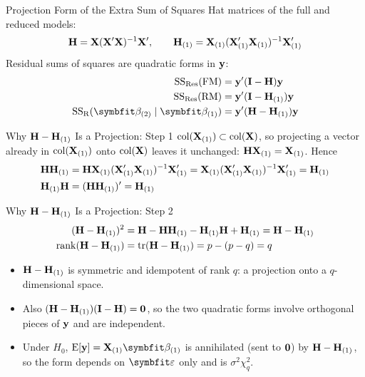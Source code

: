 \begin{frame}{Projection Form of the Extra Sum of Squares}
    Hat matrices of the full and reduced models:
    \[
    \mathbf{H}=\mathbf{X}(\mathbf{X}'\mathbf{X})^{-1}\mathbf{X}',
    \qquad
    \mathbf{H}_{(1)}=\mathbf{X}_{(1)}(\mathbf{X}_{(1)}'\mathbf{X}_{(1)})^{-1}\mathbf{X}_{(1)}'
    \]
    Residual sums of squares are quadratic forms in $\mathbf{y}$:
    \begin{align*}
        \SSRes(\FM) &= \by'(\bI-\bH)\by \\
        \SSRes(\RM) &= \by'(\bI-\bH_{(1)})\by \\
        \SSR(\bbeta_{(2)}\mid\bbeta_{(1)}) &= \by'(\bH-\bH_{(1)})\by
    \end{align*}
\end{frame}


\begin{frame}{Why $\mathbf{H}-\mathbf{H}_{(1)}$ Is a Projection: Step 1}
    $\operatorname{col}(\mathbf{X}_{(1)})\subset\operatorname{col}(\mathbf{X})$, so projecting a vector already in $\operatorname{col}(\mathbf{X}_{(1)})$ onto $\operatorname{col}(\mathbf{X})$ leaves it unchanged: $\mathbf{H}\mathbf{X}_{(1)}=\mathbf{X}_{(1)}$. Hence
    \begin{align*}
        \mathbf{H}\mathbf{H}_{(1)} &= \mathbf{H}\mathbf{X}_{(1)}(\mathbf{X}_{(1)}'\mathbf{X}_{(1)})^{-1}\mathbf{X}_{(1)}' = \mathbf{X}_{(1)}(\mathbf{X}_{(1)}'\mathbf{X}_{(1)})^{-1}\mathbf{X}_{(1)}' = \mathbf{H}_{(1)} \\
        \mathbf{H}_{(1)}\mathbf{H} &= (\mathbf{H}\mathbf{H}_{(1)})' = \mathbf{H}_{(1)}
    \end{align*}
\end{frame}


\begin{frame}{Why $\mathbf{H}-\mathbf{H}_{(1)}$ Is a Projection: Step 2}
    \begin{align*}
        (\mathbf{H}-\mathbf{H}_{(1)})^2 &= \mathbf{H} - \mathbf{H}\mathbf{H}_{(1)} - \mathbf{H}_{(1)}\mathbf{H} + \mathbf{H}_{(1)} = \mathbf{H}-\mathbf{H}_{(1)} \\
        \operatorname{rank}(\mathbf{H}-\mathbf{H}_{(1)}) &= \operatorname{tr}(\mathbf{H}-\mathbf{H}_{(1)}) = p-(p-q) = q
    \end{align*}
    \begin{itemize}
        \item $\mathbf{H}-\mathbf{H}_{(1)}$ is symmetric and idempotent of rank $q$: a projection onto a $q$-dimensional space.
        \item Also $(\mathbf{H}-\mathbf{H}_{(1)})(\mathbf{I}-\mathbf{H})=\mathbf{0}$, so the two quadratic forms involve orthogonal pieces of $\mathbf{y}$ and are independent.
        \item Under $H_0$, $\E[\by]=\bX_{(1)}\bbeta_{(1)}$ is annihilated (sent to $\mathbf{0}$) by $\mathbf{H}-\mathbf{H}_{(1)}$, so the form depends on $\bvarepsilon$ only and is $\sigma^2\chi^2_q$.
    \end{itemize}
\end{frame}


